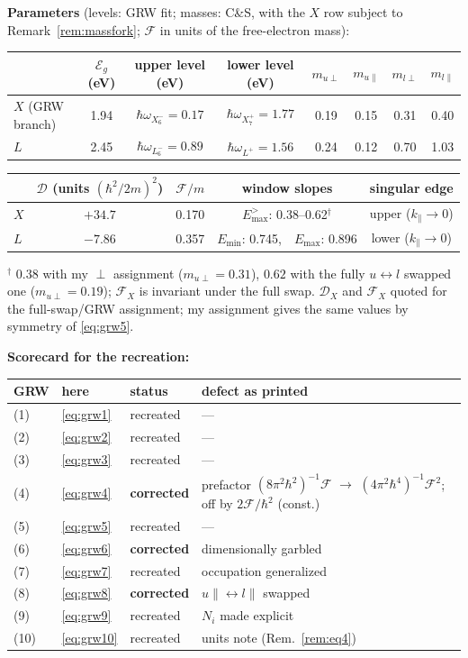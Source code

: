 \documentclass[11pt,a4paper]{article}
\numberwithin{equation}{section}
\newcommand{\cD}{\mathcal{D}}
\newcommand{\cF}{\mathcal{F}}
\newcommand{\kpar}{k_{\parallel}}
\newcommand{\wXsix}{\hbar\omega_{X_6^-}}
\newcommand{\wXseven}{\hbar\omega_{X_7^+}}
\newcommand{\wLsix}{\hbar\omega_{L_6^-}}
\newcommand{\wLplus}{\hbar\omega_{L^+}}
\begin{document}
\medskip
\noindent\textbf{Parameters} (levels: GRW fit; masses: C\&S, with the
$X$ row subject to Remark~\ref{rem:massfork}; $\cF$ in units of the
free-electron mass):
\begin{center}
\begin{tabular}{lccccccc}
\toprule
 & $\mathcal{E}_g$ (eV) & upper level (eV) & lower level (eV)
 & $m_{u\perp}$ & $m_{u\parallel}$ & $m_{l\perp}$ & $m_{l\parallel}$\\
\midrule
$X$ (GRW branch) & 1.94 & $\wXsix=0.17$ & $\wXseven=1.77$
 & 0.19 & 0.15 & 0.31 & 0.40\\
$L$ & 2.45 & $\wLsix=0.89$ & $\wLplus=1.56$
 & 0.24 & 0.12 & 0.70 & 1.03\\
\bottomrule
\end{tabular}

\medskip
\begin{tabular}{lcccc}
\toprule
 & $\cD$ (units $(\hbar^2/2m)^2$) & $\cF/m$ & window slopes & singular edge\\
\midrule
$X$ & $+34.7$ & 0.170 & $E_{\max}^{>}$: 0.38--0.62$^{\dagger}$
 & upper ($\kpar\to0$)\\
$L$ & $-7.86$ & 0.357 & $E_{\min}$: 0.745,\ \ $E_{\max}$: 0.896
 & lower ($\kpar\to0$)\\
\bottomrule
\end{tabular}
\end{center}
{\footnotesize $^{\dagger}$ $0.38$ with my $\perp$ assignment
($m_{u\perp}=0.31$), $0.62$ with the fully $u\leftrightarrow l$
swapped one ($m_{u\perp}=0.19$); $\cF_X$ is invariant under the full
swap.  $\cD_X$ and $\cF_X$ quoted for the full-swap/GRW assignment;
my assignment gives the same values by symmetry of \eqref{eq:grw5}.}

\medskip
\noindent\textbf{Scorecard for the recreation:}
\begin{center}
\begin{tabular}{llll}
\toprule
GRW & here & status & defect as printed\\
\midrule
(1) & \eqref{eq:grw1} & recreated & ---\\
(2) & \eqref{eq:grw2} & recreated & ---\\
(3) & \eqref{eq:grw3} & recreated & ---\\
(4) & \eqref{eq:grw4} & \textbf{corrected} &
 prefactor $(8\pi^2\hbar^2)^{-1}\cF$ $\to$ $(4\pi^2\hbar^4)^{-1}\cF^2$;
 off by $2\cF/\hbar^2$ (const.)\\
(5) & \eqref{eq:grw5} & recreated & ---\\
(6) & \eqref{eq:grw6} & \textbf{corrected} & dimensionally garbled\\
(7) & \eqref{eq:grw7} & recreated & occupation generalized\\
(8) & \eqref{eq:grw8} & \textbf{corrected} &
 $u\parallel\leftrightarrow l\parallel$ swapped\\
(9) & \eqref{eq:grw9} & recreated & $N_i$ made explicit\\
(10) & \eqref{eq:grw10} & recreated & units note (Rem.~\ref{rem:eq4})\\
\bottomrule
\end{tabular}
\end{center}
\end{document}
